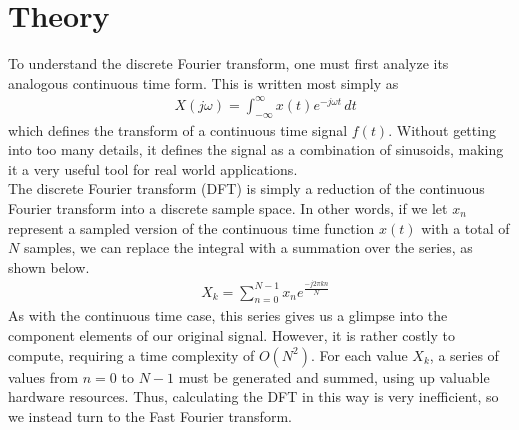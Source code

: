 \documentclass[12pt]{article}
\begin{document}
  \section*{Theory}
    To understand the discrete Fourier transform, one must first analyze its analogous continuous    time form.
    This is written most simply as
    \begin{align*}
    &X(j\omega) = \int_{-\infty}^{\infty} x(t) e^{-j \omega t}\,dt
    \end{align*}
    which defines the transform of a continuous time signal $f(t)$.
    Without getting into too many details, it defines the signal as a combination of sinusoids,      making it a very useful tool for real world applications.\\

    The discrete Fourier transform (DFT) is simply a reduction of the continuous Fourier transform   into a discrete sample space.
    In other words, if we let $x_n$ represent a sampled version of the continuous time function      $x(t)$ with a total of $N$ samples, we can replace the integral with a summation over the series, as shown below.
    \begin{align*}
        &X_k = \sum\limits_{n=0}^{N-1} x_n e^{\frac{-j2\pi kn}{N}}
    \end{align*}
    As with the continuous time case, this series gives us a glimpse into the component elements of  our original signal.
    However, it is rather costly to compute, requiring a time complexity of $O(N^2)$.
    For each value $X_k$, a series of values from $n = 0$ to $N - 1$ must be generated and summed,   using up valuable hardware resources.
    Thus, calculating the DFT in this way is very inefficient, so we instead turn to the Fast  Fourier transform.\\
\end{document}
